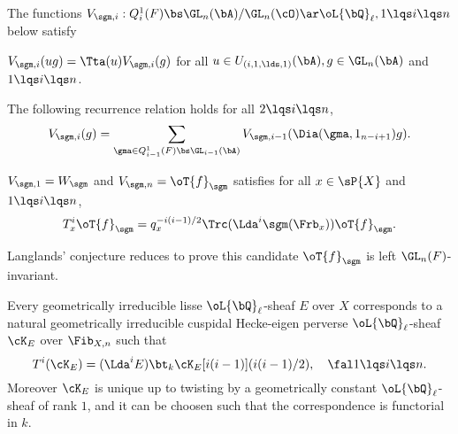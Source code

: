 \documentclass[article, a4paper, twoside]{universal}
\begin{document}
\begin{thm}
	The functions $V_{\sgm,i}:Q_{i}^{1}(F)\bs\GL_{n}(\bA)/\GL_{n}(\cO)\ar\oL{\bQ}_{\ell},1\lqs i\lqs n$ below satisfy
	\begin{itm}
		\item $V_{\sgm,i}(ug)=\Tta(u)V_{\sgm,i}(g)$ for all $u\in U_{(i,1,\lds,1)}(\bA),g\in\GL_{n}(\bA)$ and $1\lqs i\lqs n$.
		\item The following recurrence relation holds for all $2\lqs i\lqs n$,
		\[
			V_{\sgm,i}(g)=\sum_{\gma\in Q_{i-1}^{1}(F)\bs\GL_{i-1}(\bA)}V_{\sgm,i-1}(\Dia(\gma,1_{n-i+1})g).
		\]
		\item $V_{\sgm,1}=W_{\sgm}$ and $V_{\sgm,n}=\oT{f}_{\sgm}$ satisfies for all $x\in\sP{X}$ and $1\lqs i\lqs n$,
		\[
			T_{x}^{i}\oT{f}_{\sgm}=q_{x}^{-i(i-1)/2}\Trc(\Lda^{i}\sgm(\Frb_{x}))\oT{f}_{\sgm}.
		\]
	\end{itm}
\end{thm}

\begin{rmk}
	Langlands' conjecture reduces to prove this candidate $\oT{f}_{\sgm}$ is left $\GL_{n}(F)$-invariant.
\end{rmk}


\begin{cnj}
	Every geometrically irreducible lisse $\oL{\bQ}_{\ell}$-sheaf $E$ over $X$ corresponds to a natural geometrically irreducible cuspidal Hecke-eigen perverse $\oL{\bQ}_{\ell}$-sheaf $\cK_{E}$ over $\Fib_{X,n}$ such that
	\[
		T^{i}(\cK_{E})=(\Lda^{i}E)\bt_{k}\cK_{E}[i(i-1)](i(i-1)/2),\quad \fal 1\lqs i\lqs n.
	\]
	Moreover $\cK_{E}$ is unique up to twisting by a geometrically constant $\oL{\bQ}_{\ell}$-sheaf of rank $1$, and it can be choosen such that the correspondence is functorial in $k$.
\end{cnj}
\end{document}
